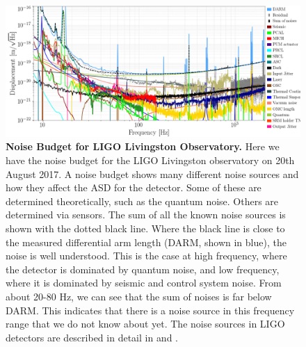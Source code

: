 \documentclass[11pt]{cuthesis}
\begin{document}
\begin{landscape}
\begin{figure}[ht]
\centering
\includegraphics[width=22cm]{L1-NOISE_BUDGET-20170820.png} 
\caption{\textbf{Noise Budget for LIGO Livingston Observatory.} Here we have the noise budget for the LIGO Livingston observatory on 20th August 2017. A noise budget shows many different noise sources and how they affect the ASD for the detector. Some of these are determined theoretically, such as the quantum noise. Others are determined via sensors. The sum of all the known noise sources is shown with the dotted black line. Where the black line is close to the measured differential arm length (DARM, shown in blue), the noise is well understood. This is the case at high frequency, where the detector is dominated by quantum noise, and low frequency, where it is dominated by seismic and control system noise. From about 20-80 Hz, we can see that the sum of noises is far below DARM. This indicates that there is a noise source in this frequency range that we do not know about yet. The noise sources in LIGO detectors are described in detail in \cite{noise_budget_martynov} and \cite{GW150914-detector}.}
\label{fig:noise budget}
\end{figure}
\end{landscape}
\end{document}
